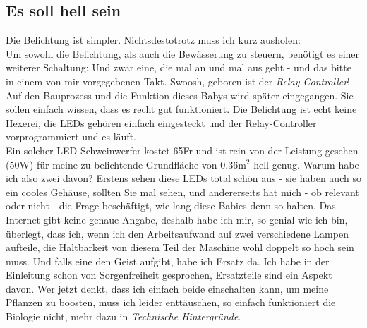 \documentclass[12pt,titlepage,a4paper]{article}
\begin{document}
\subsection{Es soll hell sein}
Die Belichtung ist simpler. Nichtsdestotrotz muss ich kurz ausholen:\\ Um sowohl die Belichtung, als auch die Bewässerung zu steuern, benötigt es einer weiterer Schaltung: Und zwar eine, die mal an und mal aus geht - und das bitte in einem von mir vorgegebenen Takt. Swoosh, geboren ist der \textit{Relay-Controller}! Auf den Bauprozess und die Funktion dieses Babys wird später eingegangen. Sie sollen einfach wissen, dass es recht gut funktioniert. Die Belichtung ist echt keine Hexerei, die LEDs gehören einfach eingesteckt und der Relay-Controller vorprogrammiert und es läuft. \\ Ein solcher LED-Schweinwerfer kostet 65Fr und ist rein von der Leistung gesehen (50W) für meine zu belichtende Grundfläche von 0.36m$^{2}$ hell genug. Warum habe ich also zwei davon? Erstens sehen diese LEDs total schön aus - sie haben auch so ein cooles Gehäuse, sollten Sie mal sehen, und andererseits hat mich - ob relevant oder nicht - die Frage beschäftigt, wie lang diese Babies denn so halten. Das Internet gibt keine genaue Angabe, deshalb habe ich mir, so genial wie ich bin, überlegt, dass ich, wenn ich den Arbeitsaufwand auf zwei verschiedene Lampen aufteile, die Haltbarkeit von diesem Teil der Maschine wohl doppelt so hoch sein muss. Und falls eine den Geist aufgibt, habe ich Ersatz da. Ich habe in der Einleitung schon von Sorgenfreiheit gesprochen, Ersatzteile sind ein Aspekt davon. Wer jetzt denkt, dass ich einfach beide einschalten kann, um meine Pflanzen zu boosten, muss ich leider enttäuschen, so einfach funktioniert die Biologie nicht, mehr dazu in \textit{Technische Hintergründe}.
\end{document}
